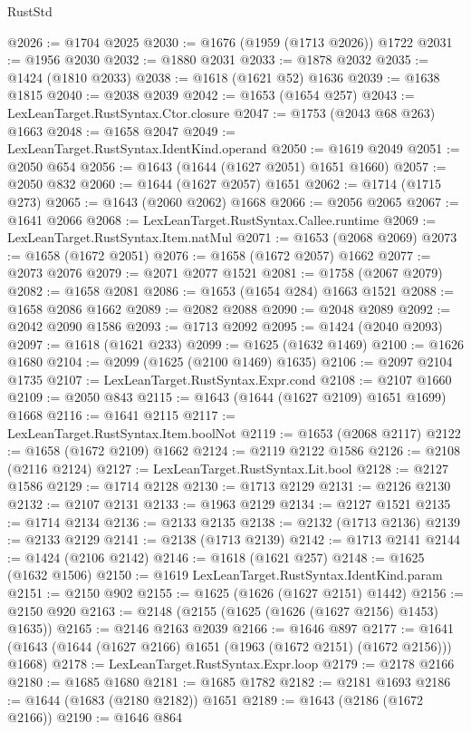 \begin{lexlean}{RustStd}
\begin{coremodule}
@2026 := @1704 @2025
@2030 := @1676 (@1959 (@1713 @2026)) @1722
@2031 := @1956 @2030
@2032 := @1880 @2031
@2033 := @1878 @2032
@2035 := @1424 (@1810 @2033)
@2038 := @1618 (@1621 @52) @1636
@2039 := @1638 @1815
@2040 := @2038 @2039
@2042 := @1653 (@1654 @257)
@2043 := LexLeanTarget.RustSyntax.Ctor.closure
@2047 := @1753 (@2043 @68 @263) @1663
@2048 := @1658 @2047
@2049 := LexLeanTarget.RustSyntax.IdentKind.operand
@2050 := @1619 @2049
@2051 := @2050 @654
@2056 := @1643 (@1644 (@1627 @2051) @1651 @1660)
@2057 := @2050 @832
@2060 := @1644 (@1627 @2057) @1651
@2062 := @1714 (@1715 @273)
@2065 := @1643 (@2060 @2062) @1668
@2066 := @2056 @2065
@2067 := @1641 @2066
@2068 := LexLeanTarget.RustSyntax.Callee.runtime
@2069 := LexLeanTarget.RustSyntax.Item.natMul
@2071 := @1653 (@2068 @2069)
@2073 := @1658 (@1672 @2051)
@2076 := @1658 (@1672 @2057) @1662
@2077 := @2073 @2076
@2079 := @2071 @2077 @1521
@2081 := @1758 (@2067 @2079)
@2082 := @1658 @2081
@2086 := @1653 (@1654 @284) @1663 @1521
@2088 := @1658 @2086 @1662
@2089 := @2082 @2088
@2090 := @2048 @2089
@2092 := @2042 @2090 @1586
@2093 := @1713 @2092
@2095 := @1424 (@2040 @2093)
@2097 := @1618 (@1621 @233)
@2099 := @1625 (@1632 @1469)
@2100 := @1626 @1680
@2104 := @2099 (@1625 (@2100 @1469) @1635)
@2106 := @2097 @2104 @1735
@2107 := LexLeanTarget.RustSyntax.Expr.cond
@2108 := @2107 @1660
@2109 := @2050 @843
@2115 := @1643 (@1644 (@1627 @2109) @1651 @1699) @1668
@2116 := @1641 @2115
@2117 := LexLeanTarget.RustSyntax.Item.boolNot
@2119 := @1653 (@2068 @2117)
@2122 := @1658 (@1672 @2109) @1662
@2124 := @2119 @2122 @1586
@2126 := @2108 (@2116 @2124)
@2127 := LexLeanTarget.RustSyntax.Lit.bool
@2128 := @2127 @1586
@2129 := @1714 @2128
@2130 := @1713 @2129
@2131 := @2126 @2130
@2132 := @2107 @2131
@2133 := @1963 @2129
@2134 := @2127 @1521
@2135 := @1714 @2134
@2136 := @2133 @2135
@2138 := @2132 (@1713 @2136)
@2139 := @2133 @2129
@2141 := @2138 (@1713 @2139)
@2142 := @1713 @2141
@2144 := @1424 (@2106 @2142)
@2146 := @1618 (@1621 @257)
@2148 := @1625 (@1632 @1506)
@2150 := @1619 LexLeanTarget.RustSyntax.IdentKind.param
@2151 := @2150 @902
@2155 := @1625 (@1626 (@1627 @2151) @1442)
@2156 := @2150 @920
@2163 := @2148 (@2155 (@1625 (@1626 (@1627 @2156) @1453) @1635))
@2165 := @2146 @2163 @2039
@2166 := @1646 @897
@2177 := @1641 (@1643 (@1644 (@1627 @2166) @1651 (@1963 (@1672 @2151) (@1672 @2156))) @1668)
@2178 := LexLeanTarget.RustSyntax.Expr.loop
@2179 := @2178 @2166
@2180 := @1685 @1680
@2181 := @1685 @1782
@2182 := @2181 @1693
@2186 := @1644 (@1683 (@2180 @2182)) @1651
@2189 := @1643 (@2186 (@1672 @2166))
@2190 := @1646 @864

\end{coremodule}
\end{lexlean}
